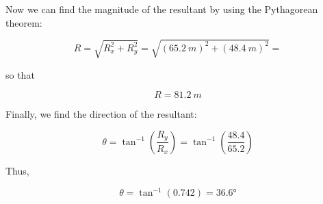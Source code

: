 \documentclass[main-ap-physics.tex]{subfiles}
\begin{document}
Now we can find the magnitude of the resultant by using the Pythagorean theorem:

\begin{equation*}
    R = \sqrt{R_x^2 + R_y^2} = \sqrt{\left(\SI{65.2}{m}\right)^2 + \left(\SI{48.4}{m}\right)^2} = 
\end{equation*}

so that 

\begin{equation*}
    R = \SI{81.2}{m}
\end{equation*}

Finally, we find the direction of the resultant:

\begin{equation*}
    \theta = \tan^{-1}\left(\frac{R_y}{R_x}\right) = \tan^{-1}\left(\frac{48.4}{65.2}\right) 
\end{equation*}

Thus,

\begin{equation*}
    \theta = \tan^{-1}\left(0.742\right) = \ang{36.6}
\end{equation*}
\end{document}
